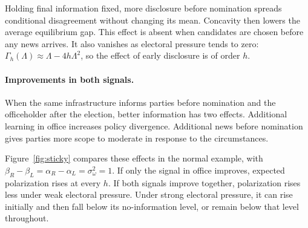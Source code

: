 \documentclass[12pt,letterpaper]{article}
\begin{document}
Holding final information fixed, more disclosure before nomination spreads conditional disagreement without changing its mean. Concavity then lowers the average equilibrium gap. This effect is absent when candidates are chosen before any news arrives. It also vanishes as electoral pressure tends to zero: $\Gamma_h(\Lambda)\approx\Lambda-4h\Lambda^2$, so the effect of early disclosure is of order $h$.

\paragraph{Improvements in both signals.}
When the same infrastructure informs parties before nomination and the officeholder after the election, better information has two effects. Additional learning in office increases policy divergence. Additional news before nomination gives parties more scope to moderate in response to the circumstances.

Figure~\ref{fig:sticky} compares these effects in the normal example, with $\beta_R-\beta_L=\alpha_R-\alpha_L=\sigma_\omega^2=1$. If only the signal in office improves, expected polarization rises at every $h$. If both signals improve together, polarization rises less under weak electoral pressure. Under strong electoral pressure, it can rise initially and then fall below its no-information level, or remain below that level throughout.
\end{document}
